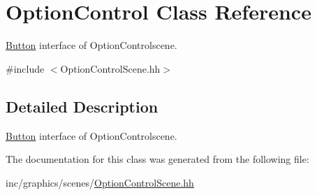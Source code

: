 \hypertarget{classOptionControl}{}\section{Option\+Control Class Reference}
\label{classOptionControl}


\hyperlink{classButton}{Button} interface of Option\+Controlscene.  




{\ttfamily \#include $<$Option\+Control\+Scene.\+hh$>$}



\subsection{Detailed Description}
\hyperlink{classButton}{Button} interface of Option\+Controlscene. 

The documentation for this class was generated from the following file\+:\begin{DoxyCompactItemize}
\item 
inc/graphics/scenes/\hyperlink{OptionControlScene_8hh}{Option\+Control\+Scene.\+hh}\end{DoxyCompactItemize}
